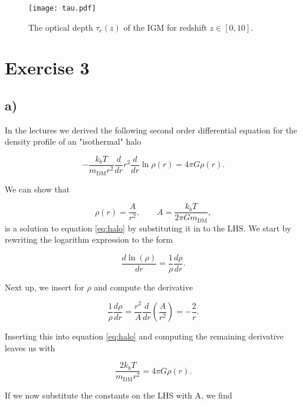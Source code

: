 \documentclass[a4paper]{article}
\begin{document}
\begin{figure}
    \centering
    \texttt{[image: tau.pdf]}
    \caption{The optical depth $\tau_e(z)$ of the IGM for redshift $z\in [0,10]$.}
    \label{fig:tau}
\end{figure}

\section*{Exercise 3}
\subsection*{a)}

In the lectures we derived the following second order differential equation for the density
profile of an "isothermal" halo

\begin{equation}\label{eq:halo}
    -\frac{k_b T}{m_{\text{DM}}r^2} \frac{d}{dr} r^2 \frac{d}{dr} \ln{\rho(r)} = 4\pi G \rho(r).
\end{equation}

\noindent We can show that

\begin{equation}\label{eq:halodef}
    \rho(r) = \frac{A}{r^2}, \qquad A = \frac{k_bT}{2\pi G m_{\text{DM}}},
\end{equation}
is a solution to equation \eqref{eq:halo} by substituting it in to the LHS.
We start by rewriting the logarithm expression to the form

\begin{equation*}
    \frac{d \ln(\rho)}{dr} = \frac{1}{\rho} \frac{d \rho}{dr}.
\end{equation*}

\noindent Next up, we insert for $\rho$ and compute the derivative

\begin{equation*}
    \frac{1}{\rho} \frac{d \rho}{dr} = \frac{r^2}{A} \frac{d}{dr} \left( \frac{A}{r^2} \right) = -\frac{2}{r}. 
\end{equation*}

\noindent Inserting this into equation \eqref{eq:halo} and computing the remaining derivative
leaves us with

\begin{equation}\label{eq:halosub}
    \frac{2k_b T}{m_{\text{DM}}r^2} = 4\pi G \rho(r).
\end{equation}

\noindent If we now substitute the constants on the LHS with A, we find
\end{document}
